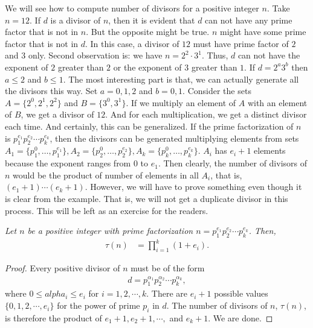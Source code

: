 \documentclass[12pt]{subfile}
\begin{document}
		We will see how to compute number of divisors for a positive integer $n$. Take $n=12$. If $d$ is a divisor of $n$, then it is evident that $d$ can not have any prime factor that is not in $n$. But the opposite might be true. $n$ might have some prime factor that is not in $d$. In this case, a divisor of $12$ must have prime factor of $2$ and $3$ only. Second observation is: we have $n=2^2\cdot3^1$. Thus, $d$ can not have the exponent of $2$ greater than $2$ or the exponent of $3$ greater than $1$. If $d=2^a3^b$ then $a\leq2$ and $b\leq1$. The most interesting part is that, we can actually generate all the divisors this way. Set $a=0,1,2$ and $b=0,1$. Consider the sets $A=\{2^0,2^1,2^2\}$ and $B=\{3^0,3^1\}$. If we multiply an element of $A$ with an element of $B$, we get a divisor of $12$. And for each multiplication, we get a distinct divisor each time. And certainly, this can be generalized. If the prime factorization of $n$ is $p_1^{e_1}p_2^{e_2}\cdots p_k^{e_k}$, then the divisors can be generated multiplying elements from sets $A_1=\{p_1^0,\ldots,p_1^{e_1}\},A_2=\{p_2^{0},\ldots,p_2^{e_2}\},A_k=\{p_k^0,\ldots,p_k^{e_k} \}$. $A_i$ has $e_i+1$ elements because the exponent ranges from $0$ to $e_1$. Then clearly, the number of divisors of $n$ would be the product of number of elements in all $A_i$, that is, $(e_1+1)\cdots(e_k+1)$. However, we will have to prove something even though it is clear from the example. That is, we will not get a duplicate divisor in this process. This will be left as an exercise for the readers.
			\begin{theorem}\slshape
				Let $n$ be a positive integer with prime factorization $n=p_1^{e_1}p_2^{e_2}\cdots p_k^{e_k}$. Then,
				\begin{align}
				\tau(n) &= \prod_{i=1}^{k} (1+e_i). \label{eq:dformula-eq1}
				\end{align}
			\end{theorem}

			\begin{proof}
				Every positive divisor of $n$ must be of the form
				\begin{align*}
				d = p_1^{\alpha_1} p_2^{\alpha_2} \cdots p_k^{\alpha_k},
				\end{align*}
				where $0 \leq alpha_i \leq e_i$ for $i=1,2,\cdots,k$. There are $e_i+1$ possible values $\{0, 1, 2, \cdots, e_i\}$ for the power of prime $p_i$ in $d$. The number of divisors of $n$, $\tau(n)$, is therefore the product of $e_1+1, e_2+1, \cdots ,$ and $e_k+1$. We are done.
			\end{proof}
\end{document}
